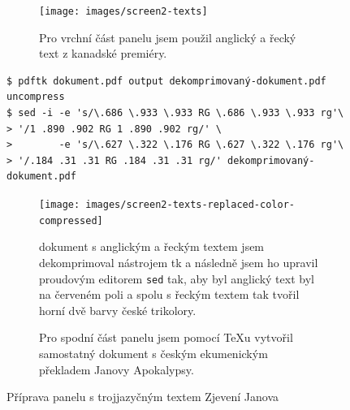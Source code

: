 \begin{figure}[p]
\begin{subfigure}{\linewidth}
\centering
\texttt{[image: images/screen2-texts]}
\caption{Pro vrchní část panelu jsem použil anglický a řecký text z kanadské premiéry.~\cite{morland2018fantasia}}
\label{fig:screen2-texts-greek-and-english-original}
\end{subfigure}
\par\vspace{5pt}
\begingroup
\small
\begin{verbatim}
$ pdftk dokument.pdf output dekomprimovaný-dokument.pdf uncompress
$ sed -i -e 's/\.686 \.933 \.933 RG \.686 \.933 \.933 rg'\
> '/1 .890 .902 RG 1 .890 .902 rg/' \
>        -e 's/\.627 \.322 \.176 RG \.627 \.322 \.176 rg'\
> '/.184 .31 .31 RG .184 .31 .31 rg/' dekomprimovaný-dokument.pdf
\end{verbatim}
\endgroup
\par\vspace{2.5pt}
\begin{subfigure}{\linewidth}
\centering
\texttt{[image: images/screen2-texts-replaced-color-compressed]}
\caption{ dokument s anglickým a řeckým textem jsem dekomprimoval nástrojem \acro{PDF}tk a následně jsem ho upravil proudovým editorem \texttt{sed} tak, aby byl anglický text byl na červeném poli a spolu s řeckým textem tak tvořil horní dvě barvy české trikolory.}
\label{fig:screen2-texts-greek-and-english-updated}
\end{subfigure}
\par\vspace{10pt}
\begin{subfigure}{\linewidth}
\centering
{}
\caption{Pro spodní část panelu jsem pomocí \TeX u vytvořil samostatný dokument s českým ekumenickým překladem Janovy Apokalypsy.}
\label{fig:screen2-texts-czech}
\end{subfigure}
\caption{Příprava panelu s trojjazyčným textem Zjevení Janova}
\label{fig:screen2-texts}
\end{figure}
